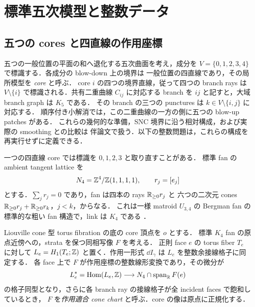 \section{標準五次模型と整数データ}
\label{ar17:setup}

\subsection{五つの cores と四直線の作用座標}

五つの一般位置の平面の和へ退化する五次曲面を考え，成分を
$V=\{0,1,2,3,4\}$ で標識する．各成分の blow-down 上の境界は
一般位置の四直線であり，その局所模型を \emph{core} と呼ぶ．
core $i$ の四つの境界直線，従って四つの branch rays は
$V\setminus\{i\}$ で標識される．共有二重曲線 $C_{ij}$ に対応する
branch を $ij$ と記すと，大域 branch graph は $K_5$ である．
その branch の三つの punctures は $k\in V\setminus\{i,j\}$ に対応する．
順序付き小解消では，この二重曲線の一方の側に五つの blow-up patches がある．
これらの幾何的な準備，SNC 境界に沿う相対構成，および実際の smoothing との比較は
伴論文\cite{SurfaceGeometry}で扱う．以下の整数問題は，これらの構成を再実行せずに定義できる．

一つの四直線 core では標識を $0,1,2,3$ と取り直すことがある．
標準 fan の ambient tangent lattice を
\[
 N_4=\mathbb Z^4/\mathbb Z(1,1,1,1),\qquad r_j=[e_j]
\]
とする．$\sum_jr_j=0$ であり，fan は四本の rays $\mathbb R_{\ge0}r_j$ と
六つの二次元 cones $\mathbb R_{\ge0}r_j+\mathbb R_{\ge0}r_k$，$j<k$，からなる．
これは一様 matroid $U_{3,4}$ の Bergman fan の標準的な粗い fan 構造で，link は $K_4$ である
\cite{FeichtnerSturmfels,ArdilaKlivans}．

\begin{definition}
\label{per:chart-definition}
Liouville cone 型 torus fibration の底の core 頂点を $o$ とする．
標準 $K_4$ fan の原点近傍への，strata を保つ同相写像 $F$ を考える．
正則 face $e$ の torus fiber $T_e$ に対して
$L_e=H_1(T_e;\mathbb Z)$ と置く．作用一形式 $\dd I_\gamma$ は $L_e$ を整数余接線格子に同定する．
各 face 上で $F$ が作用座標の整数線形変換であり，その微分が
\[
 L_e^*=\operatorname{Hom}(L_e,\mathbb Z)
 \longrightarrow N_4\cap\operatorname{span}_{\mathbb R}F(e)
\]
の格子同型となり，さらに各 branch ray の接線格子が全 incident faces で飽和しているとき，
$F$ を\emph{作用適合 cone chart} と呼ぶ．core の像は原点に正規化する．
\end{definition}

